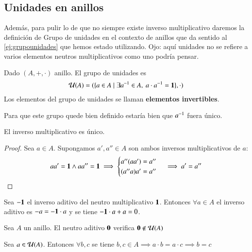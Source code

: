 \subsection{Unidades en anillos}

Además, para pulir lo de que no siempre existe inverso multiplicativo daremos la definición de Grupo de unidades en el contexto de anillos que da sentido al \autoref{ej:grupounidades} que hemos estado utilizando. Ojo: aquí unidades no se refiere a varios elementos neutros multiplicativos como uno podría pensar.

\begin{dfn}
	Dado $(A, +, \cdot)$ anillo. El grupo de unidades es
	\begin{align}
		\mathcal{U}(A) = (\{a \in A \mid \exists a^{-1} \in A,\ a\cdot a^{-1} = \mathbf{1}\}, \cdot)
	\end{align}
	Los elementos del grupo de unidades se llaman \textbf{elementos invertibles}.
\end{dfn}

Para que este grupo quede bien definido estaría bien que $a^{-1}$ fuera único.

\begin{pro}
	El inverso multiplicativo es único.
\end{pro}

\begin{proof}
	Sea $a \in A$. Supongamos $a', a'' \in A$ son ambos inversos multiplicativos de $a$:
	\begin{align*}
		aa' = \mathbf{1} \land aa'' = \mathbf{1}\implies \begin{cases}
		a''(aa') = a'' \\
		(a''a)a' = a''
		\end{cases}\implies a' = a''
	\end{align*}
\end{proof}

\begin{pro}
	Sea $-\mathbf{1}$ el inverso aditivo del neutro multiplicativo $\mathbf{1}$. Entonces $\forall a \in A$ el inverso aditivo es $-a = -\mathbf{1} \cdot a$ y se tiene $-\mathbf{1}\cdot a + a = 0$.
\end{pro}

\begin{pro}
	Sea $A$ un anillo. El neutro aditivo $\mathbf{0}$ verifica $\mathbf{0} \not\in \mathcal{U}(A)$
\end{pro}

\begin{pro}
	Sea $a \in \mathcal{U}(A)$. Entonces $\forall b,c$ se tiene $b, c \in A \implies a\cdot b = a\cdot c \implies b = c$
\end{pro}


